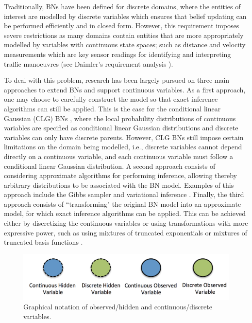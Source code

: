 Traditionally, BNs have been defined for discrete domains, where the entities of interest are modelled by discrete variables which ensures that belief updating can be performed efficiently and in closed form. However, this requirement imposes severe restrictions as many domains contain entities that are more appropriately modelled by variables with continuous state spaces; such as distance and velocity measurements which are key sensor readings for identifying and interpreting traffic manoeuvres (see Daimler's requirement analysis \cite{Fer14}). 

To deal with this problem, research has been largely pursued on three main approaches to extend BNs and support continuous variables. As a first approach, one may choose to carefully construct the model so that exact inference algorithms can still be applied. This is the case for the conditional linear Gaussian (CLG) BNs \cite{Lauritzen1992,LauritzenJensen2001}, where the local probability distributions of continuous variables are specified as conditional linear Gaussian distributions and discrete variables can only have discrete parents. However, CLG BNs still impose certain limitations on the domain being modelled, i.e., discrete variables cannot depend directly on a continuous variable, and each continuous variable must follow a conditional linear Gaussian distribution. A second approach consists of considering approximate algorithms for performing inference, allowing thereby arbitrary distributions to be associated with the BN model. Examples of this approach include the Gibbs sampler \cite{Geman1984, hrycej1990gibbs} and variational inference \cite{Jordan1999}. Finally, the third approach consists of ``transforming" the original BN model into an approximate model, for which exact inference algorithms can be applied. This can be achieved either by discretizing the continuous variables \cite{KozlovKollerUAI97} or using transformations with more expressive power, such as using mixtures of truncated exponentials \cite{Moral2001} or mixtures of truncated basis functions \cite{Langseth12}.

\begin{figure}
\begin{center}
\includegraphics[scale=0.4]{./figures/PreliminariesNotation}
\caption{\label{Figure:PreliminariesNotation}Graphical notation of observed/hidden and continuous/discrete variables.
}
\end{center}
\end{figure}


